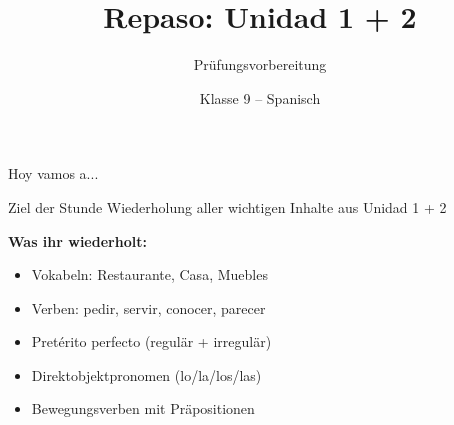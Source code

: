 \documentclass[aspectratio=169,11pt]{beamer}
\title{Repaso: Unidad 1 + 2}
\subtitle{Prüfungsvorbereitung}
\author{Klasse 9 -- Spanisch}
\date{}
\begin{document}

\begin{frame}
\titlepage
\end{frame}


\begin{frame}{Hoy vamos a...}

\begin{block}{Ziel der Stunde}
Wiederholung aller wichtigen Inhalte aus Unidad 1 + 2
\end{block}

\vspace{5mm}

\textbf{Was ihr wiederholt:}
\begin{itemize}
    \item Vokabeln: Restaurante, Casa, Muebles
    \item Verben: pedir, servir, conocer, parecer
    \item Pretérito perfecto (regulär + irregulär)
    \item Direktobjektpronomen (lo/la/los/las)
    \item Bewegungsverben mit Präpositionen
\end{itemize}

\end{frame}

\end{document}
